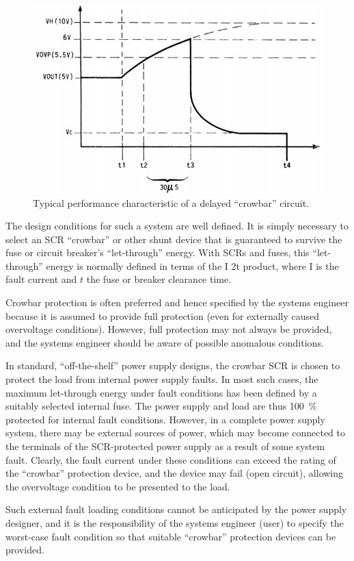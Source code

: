 \documentclass[journal]{IEEEtran}
\begin{document}
    \begin{figure}[!ht] %
      \centering
      \includegraphics[width=1\linewidth]{fig_HW008.png}
      \caption{Typical performance characteristic of a delayed “crowbar” circuit.}
      \label{HW002:fig008}
    \end{figure}
    
    The design conditions for such a system are well defined. It is simply necessary to select
    an SCR “crowbar” or other shunt device that is guaranteed to survive the fuse or circuit
    breaker’s “let-through” energy. With SCRs and fuses, this “let-through” energy is normally
    defined in terms of the I 2t product, where I is the fault current and \(t\) the fuse or breaker
    clearance time.
    
    Crowbar protection is often preferred and hence specified by the systems engineer
    because it is assumed to provide full protection (even for externally caused overvoltage
    conditions). However, full protection may not always be provided, and the systems engineer
    should be aware of possible anomalous conditions.
    
    In standard, “off-the-shelf” power supply designs, the crowbar SCR is chosen to protect
    the load from internal power supply faults. In most such cases, the maximum let-through
    energy under fault conditions has been defined by a suitably selected internal fuse. The
    power supply and load are thus \SI{100}{\percent} protected for internal fault conditions. 
    However, in a complete power supply system, there may be external sources of power, which may
    become connected to the terminals of the SCR-protected power supply as a result of some
    system fault. Clearly, the fault current under these conditions can exceed the rating of the
    “crowbar” protection device, and the device may fail (open circuit), allowing the overvoltage
    condition to be presented to the load.
    
    Such external fault loading conditions cannot be anticipated by the power supply
    designer, and it is the responsibility of the systems engineer (user) to specify the worst-case
    fault condition so that suitable “crowbar” protection devices can be provided.
    
  \nocite{*}
\printbibliography
\end{document}
